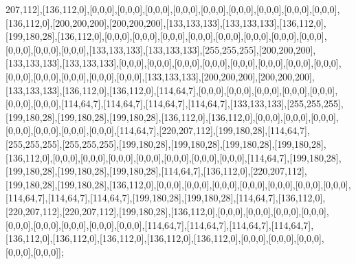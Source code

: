 207,112],[136,112,0],[0,0,0],[0,0,0],[0,0,0],[0,0,0],[0,0,0],[0,0,0],[0,0,0],[0,0,0],[0,0,0],[136,112,0],[200,200,200],[200,200,200],[133,133,133],[133,133,133],[136,112,0],[199,180,28],[136,112,0],[0,0,0],[0,0,0],[0,0,0],[0,0,0],[0,0,0],[0,0,0],[0,0,0],[0,0,0],[0,0,0],[0,0,0],[0,0,0],[133,133,133],[133,133,133],[255,255,255],[200,200,200],[133,133,133],[133,133,133],[0,0,0],[0,0,0],[0,0,0],[0,0,0],[0,0,0],[0,0,0],[0,0,0],[0,0,0],[0,0,0],[0,0,0],[0,0,0],[0,0,0],[0,0,0],[133,133,133],[200,200,200],[200,200,200],[133,133,133],[136,112,0],[136,112,0],[114,64,7],[0,0,0],[0,0,0],[0,0,0],[0,0,0],[0,0,0],[0,0,0],[0,0,0],[114,64,7],[114,64,7],[114,64,7],[114,64,7],[133,133,133],[255,255,255],[199,180,28],[199,180,28],[199,180,28],[136,112,0],[136,112,0],[0,0,0],[0,0,0],[0,0,0],[0,0,0],[0,0,0],[0,0,0],[0,0,0],[114,64,7],[220,207,112],[199,180,28],[114,64,7],[255,255,255],[255,255,255],[199,180,28],[199,180,28],[199,180,28],[199,180,28],[136,112,0],[0,0,0],[0,0,0],[0,0,0],[0,0,0],[0,0,0],[0,0,0],[0,0,0],[114,64,7],[199,180,28],[199,180,28],[199,180,28],[199,180,28],[114,64,7],[136,112,0],[220,207,112],[199,180,28],[199,180,28],[136,112,0],[0,0,0],[0,0,0],[0,0,0],[0,0,0],[0,0,0],[0,0,0],[0,0,0],[114,64,7],[114,64,7],[114,64,7],[199,180,28],[199,180,28],[114,64,7],[136,112,0],[220,207,112],[220,207,112],[199,180,28],[136,112,0],[0,0,0],[0,0,0],[0,0,0],[0,0,0],[0,0,0],[0,0,0],[0,0,0],[0,0,0],[0,0,0],[114,64,7],[114,64,7],[114,64,7],[114,64,7],[136,112,0],[136,112,0],[136,112,0],[136,112,0],[136,112,0],[0,0,0],[0,0,0],[0,0,0],[0,0,0],[0,0,0]];

